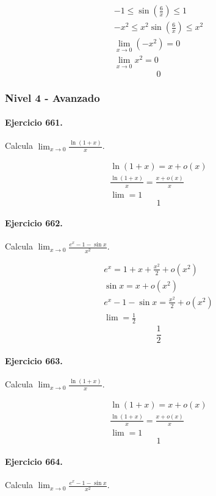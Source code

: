 \documentclass[11pt,a4paper]{article}
\begin{document}
\[
\begin{aligned}
-1\le\sin\left(\frac{6}{x}\right)\le1\\
-x^2\le x^2\sin\left(\frac{6}{x}\right)\le x^2\\
\lim_{x\to0}(-x^2)=0\\
\lim_{x\to0}x^2=0
\end{aligned}
\]
\[\boxed{0}\]


\newpage

\subsubsection*{Nivel 4 - Avanzado}

\paragraph{Ejercicio 661.} Calcula $\displaystyle\lim_{x\to0}\frac{\ln(1+x)}{x}$.

\[
\begin{aligned}
\ln(1+x)=x+o(x)\\
\frac{\ln(1+x)}{x}=\frac{x+o(x)}{x}\\
\lim=1
\end{aligned}
\]
\[\boxed{1}\]


\paragraph{Ejercicio 662.} Calcula $\displaystyle\lim_{x\to0}\frac{e^x-1-\sin x}{x^2}$.

\[
\begin{aligned}
e^x=1+x+\frac{x^2}{2}+o(x^2)\\
\sin x=x+o(x^2)\\
e^x-1-\sin x=\frac{x^2}{2}+o(x^2)\\
\lim=\frac12
\end{aligned}
\]
\[\boxed{\frac12}\]


\paragraph{Ejercicio 663.} Calcula $\displaystyle\lim_{x\to0}\frac{\ln(1+x)}{x}$.

\[
\begin{aligned}
\ln(1+x)=x+o(x)\\
\frac{\ln(1+x)}{x}=\frac{x+o(x)}{x}\\
\lim=1
\end{aligned}
\]
\[\boxed{1}\]


\paragraph{Ejercicio 664.} Calcula $\displaystyle\lim_{x\to0}\frac{e^x-1-\sin x}{x^2}$.
\end{document}
